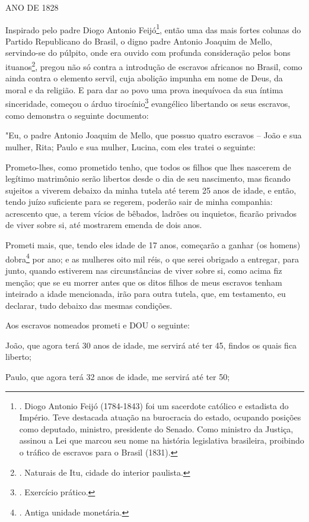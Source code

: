 ANO DE 1828

Inspirado pelo padre Diogo Antonio Feijó\footnote{. Diogo Antonio Feijó
  (1784-1843) foi um sacerdote católico e estadista do Império. Teve
  destacada atuação na burocracia do estado, ocupando posições como
  deputado, ministro, presidente do Senado. Como ministro da Justiça,
  assinou a Lei que marcou seu nome na história legislativa brasileira,
  proibindo o tráfico de escravos para o Brasil (1831).}, então uma das
mais fortes colunas do Partido Republicano do Brasil, o digno padre
Antonio Joaquim de Mello, servindo-se do púlpito, onde era ouvido com
profunda consideração pelos bons ituanos\footnote{. Naturais de Itu,
  cidade do interior paulista.}, pregou não só contra a introdução de
escravos africanos no Brasil, como ainda contra o elemento servil, cuja
abolição impunha em nome de Deus, da moral e da religião. E para dar ao
povo uma prova inequívoca da sua íntima sinceridade, começou o árduo
tirocínio\footnote{. Exercício prático.} evangélico libertando os seus
escravos, como demonstra o seguinte documento:

"Eu, o padre Antonio Joaquim de Mello, que possuo quatro escravos --
João e sua mulher, Rita; Paulo e sua mulher, Lucina, com eles tratei o
seguinte:

Prometo-lhes, como prometido tenho, que todos os filhos que lhes
nascerem de legítimo matrimônio serão libertos desde o dia de seu
nascimento, mas ficando sujeitos a viverem debaixo da minha tutela até
terem 25 anos de idade, e então, tendo juízo suficiente para se regerem,
poderão sair de minha companhia: acrescento que, a terem vícios de
bêbados, ladrões ou inquietos, ficarão privados de viver sobre si, até
mostrarem emenda de dois anos.

Prometi mais, que, tendo eles idade de 17 anos, começarão a ganhar (os
homens) dobra\footnote{. Antiga unidade monetária.} por ano; e as
mulheres oito mil réis, o que serei obrigado a entregar, para junto,
quando estiverem nas circunstâncias de viver sobre si, como acima fiz
menção; que se eu morrer antes que os ditos filhos de meus escravos
tenham inteirado a idade mencionada, irão para outra tutela, que, em
testamento, eu declarar, tudo debaixo das mesmas condições.

Aos escravos nomeados prometi e DOU o seguinte:

João, que agora terá 30 anos de idade, me servirá até ter 45, findos os
quais fica liberto;

Paulo, que agora terá 32 anos de idade, me servirá até ter 50;

